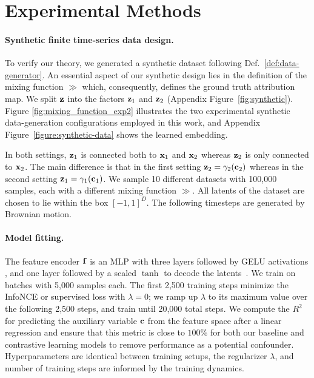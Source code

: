 \section{Experimental Methods}
\label{sec:methods}

\paragraph{Synthetic finite time-series data design.}
    To verify our theory, we generated a synthetic dataset following Def.~\ref{def:data-generator}. An essential aspect of our synthetic design lies in the definition of the mixing function $\gg$ which, consequently, defines the ground truth attribution map. We split $\mathbf{z}$ into the factors $\mathbf{z}_1$ and $\mathbf{z}_2$ (Appendix Figure~\ref{fig:synthetic}). Figure \ref{fig:mixing_function_exp2} illustrates the two experimental synthetic data-generation configurations employed in this work, and Appendix Figure~\ref{figure:synthetic-data} shows the learned embedding. 
    
    In both settings, $\mathbf{z}_1$ is connected both to $\mathbf{x}_1$ and $\mathbf{x}_2$ whereas $\mathbf{z}_2$ is only connected to $\mathbf{x}_2$. The main difference is that in the first setting $\mathbf{z}_2 = \gamma_2(\mathbf{c}_2)$ whereas in the second setting $\mathbf{z}_1 = \gamma_1(\mathbf{c}_1)$.
    We sample 10 different datasets with 100,000 samples, each with a different mixing function $\gg$. All latents of the dataset are chosen to lie within the box $[-1, 1]^D$. The following timesteps are generated by Brownian motion.

\paragraph{Model fitting.}
    The feature encoder $\mathbf{f}$ is an MLP with three layers followed by GELU activations \citep{hendrycks2016gaussian}, and one layer followed by a scaled $\tanh$ to decode the latents~\cite{schneider2023cebra}. We train on batches with 5,000 samples each. The first 2,500 training steps minimize the InfoNCE or supervised loss with $\lambda=0$; we ramp up $\lambda$ to its maximum value over the following 2,500 steps, and train until 20,000 total steps.
    We compute the $R^2$ for predicting the auxiliary variable $\mathbf{c}$ from the feature space after a linear regression and ensure that this metric is close to $100\%$ for both our baseline and contrastive learning models to remove performance as a potential confounder.
    Hyperparameters are identical between training setups, the regularizer $\lambda$, and number of training steps are informed by the training dynamics.
        
